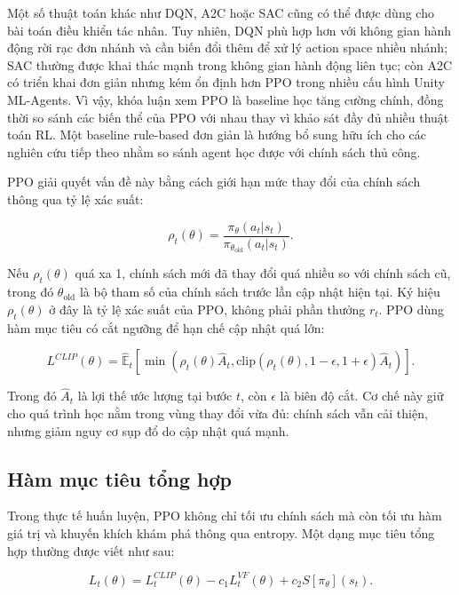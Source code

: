 Một số thuật toán khác như DQN, A2C hoặc SAC cũng có thể được dùng cho bài toán điều khiển tác nhân. Tuy nhiên, DQN phù hợp hơn với không gian hành động rời rạc đơn nhánh và cần biến đổi thêm để xử lý action space nhiều nhánh; SAC thường được khai thác mạnh trong không gian hành động liên tục; còn A2C có triển khai đơn giản nhưng kém ổn định hơn PPO trong nhiều cấu hình Unity ML-Agents. Vì vậy, khóa luận xem PPO là baseline học tăng cường chính, đồng thời so sánh các biến thể của PPO với nhau thay vì khảo sát đầy đủ nhiều thuật toán RL. Một baseline rule-based đơn giản là hướng bổ sung hữu ích cho các nghiên cứu tiếp theo nhằm so sánh agent học được với chính sách thủ công.

PPO giải quyết vấn đề này bằng cách giới hạn mức thay đổi của chính sách thông qua tỷ lệ xác suất:

\begin{equation}
    \rho_t(\theta) =
    \frac{\pi_\theta(a_t|s_t)}
    {\pi_{\theta_{\mathrm{old}}}(a_t|s_t)}.
\end{equation}

Nếu $\rho_t(\theta)$ quá xa 1, chính sách mới đã thay đổi quá nhiều so với chính sách cũ, trong đó $\theta_{\mathrm{old}}$ là bộ tham số của chính sách trước lần cập nhật hiện tại. Ký hiệu $\rho_t(\theta)$ ở đây là tỷ lệ xác suất của PPO, không phải phần thưởng $r_t$. PPO dùng hàm mục tiêu có cắt ngưỡng để hạn chế cập nhật quá lớn:

\begin{equation} \label{eq:ppo_clip}
    L^{CLIP}(\theta) =
    \hat{\mathbb{E}}_t
    \left[
    \min
    \left(
    \rho_t(\theta)\hat{A}_t,
    \mathrm{clip}(\rho_t(\theta),1-\epsilon,1+\epsilon)\hat{A}_t
    \right)
    \right].
\end{equation}

Trong đó $\hat{A}_t$ là lợi thế ước lượng tại bước $t$, còn $\epsilon$ là biên độ cắt. Cơ chế này giữ cho quá trình học nằm trong vùng thay đổi vừa đủ: chính sách vẫn cải thiện, nhưng giảm nguy cơ sụp đổ do cập nhật quá mạnh.

\subsection{Hàm mục tiêu tổng hợp}

Trong thực tế huấn luyện, PPO không chỉ tối ưu chính sách mà còn tối ưu hàm giá trị và khuyến khích khám phá thông qua entropy. Một dạng mục tiêu tổng hợp thường được viết như sau:

\begin{equation} \label{eq:ppo_total}
    L_t(\theta) =
    L_t^{CLIP}(\theta)
    - c_1 L_t^{VF}(\theta)
    + c_2 S[\pi_\theta](s_t).
\end{equation}


